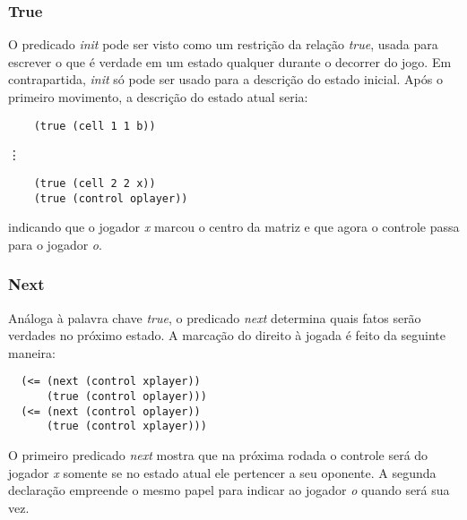 \subsubsection*{True}
O predicado \textit{init} pode ser visto como um restrição da relação \textit{true}, usada para escrever o que é verdade em um estado qualquer durante o decorrer do jogo. Em contrapartida, \textit{init} só pode ser usado para a descrição do estado inicial. Após o primeiro movimento, a descrição do estado atual seria:
\begin{verbatim}                                                                                         
	(true (cell 1 1 b))
\end{verbatim}
	\hspace{1.5cm} {\LARGE{ \vdots }}
\begin{verbatim}	
  	(true (cell 2 2 x))                                                                                    
  	(true (control oplayer))                                                                               
\end{verbatim}
indicando que o jogador \textit{x} marcou o centro da matriz e que agora o controle passa para o jogador \textit{o}.

\subsubsection*{Next}
Análoga à palavra chave \textit{true}, o predicado \textit{next} determina quais fatos serão verdades no próximo estado. A marcação do direito à jogada é feito da seguinte maneira:
\begin{verbatim}                                                                                         
  (<= (next (control xplayer))                                                                           
      (true (control oplayer)))                                                                          
  (<= (next (control oplayer))                                                                           
      (true (control xplayer)))                                                                          
\end{verbatim}
O primeiro predicado \textit{next} mostra que na próxima rodada o controle será do jogador \textit{x} somente se no estado atual ele pertencer a seu oponente. A segunda declaração empreende o mesmo papel para indicar ao jogador \textit{o} quando será sua vez.

